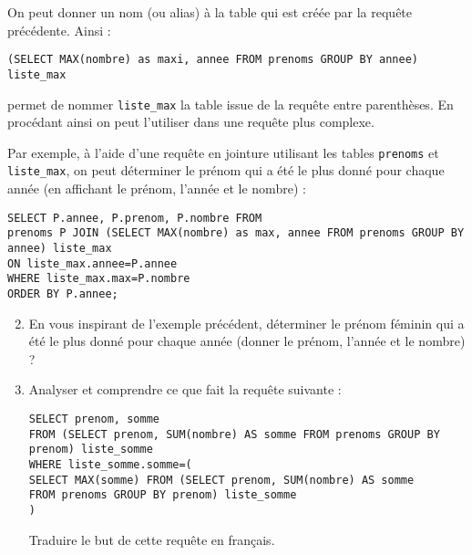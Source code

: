 \begin{enumerate}
    On peut donner un nom (ou alias) à la table qui est créée par la requête précédente. Ainsi :
    
    \verb|(SELECT MAX(nombre) as maxi, annee FROM prenoms GROUP BY annee) liste_max|
    
    permet de nommer \verb|liste_max| la table issue de la requête entre parenthèses. En procédant ainsi on peut l'utiliser dans une requête plus complexe.    
        
    Par exemple, à l'aide d'une requête en jointure utilisant les tables \verb|prenoms| et \verb|liste_max|, on peut déterminer le prénom qui a été le plus donné pour chaque année (en affichant le prénom, l'année et le nombre) :
    
    \verb|SELECT P.annee, P.prenom, P.nombre FROM|\\
    \verb|prenoms P JOIN (SELECT MAX(nombre) as max, annee FROM prenoms GROUP BY annee) liste_max|\\
    \verb|ON liste_max.annee=P.annee|\\
    \verb|WHERE liste_max.max=P.nombre|\\
    \verb|ORDER BY P.annee;|\\
    
    \begin{enumerate}
    \setcounter{enumii}{1}
    \item En vous inspirant de l'exemple précédent, déterminer le prénom féminin qui a été le plus donné pour chaque année (donner le prénom, l'année et le nombre) ?
    
    \item Analyser et comprendre ce que fait la requête suivante :
    
    
    \verb|SELECT prenom, somme|\\
    \verb|FROM (SELECT prenom, SUM(nombre) AS somme FROM prenoms GROUP BY prenom) liste_somme|\\
    \verb|WHERE liste_somme.somme=(|\\
    \verb|SELECT MAX(somme) FROM (SELECT prenom, SUM(nombre) AS somme|\\
    \verb|FROM prenoms GROUP BY prenom) liste_somme|\\
    \verb|)|
 
    Traduire le but de cette requête en français.
                                                                                                                                                       
    \end{enumerate}
    

\end{enumerate}

